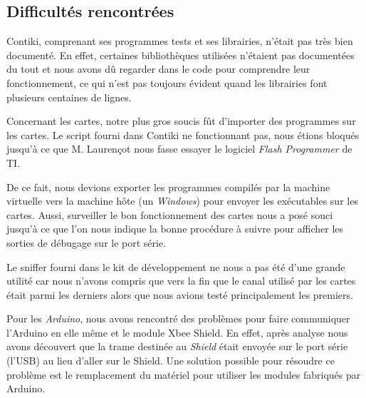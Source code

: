 
\subsection{Difficultés rencontrées}

Contiki, comprenant ses programmes tests et ses librairies, n'était pas très bien documenté.
En effet, certaines bibliothèques utilisées n'étaient pas documentées du tout et nous avons dû regarder dans le code pour comprendre leur fonctionnement, ce qui n'est pas toujours évident quand les librairies font plusieurs centaines de lignes.


Concernant les cartes, notre plus gros soucis fût d'importer des programmes sur les cartes.
Le script fourni dans Contiki ne fonctionnant pas, nous étions bloqués jusqu'à ce que M. Laurençot nous fasse essayer le logiciel \emph{Flash Programmer} de TI.

De ce fait, nous devions exporter les programmes compilés par la machine virtuelle vers la machine hôte (un \emph{Windows}) pour envoyer les exécutables sur les cartes.
Aussi, surveiller le bon fonctionnement des cartes nous a posé souci jusqu'à ce que l'on nous indique la bonne procédure à suivre pour afficher les sorties de débugage sur le port série.


Le sniffer fourni dans le kit de développement ne nous a pas été d'une grande utilité car nous n'avons compris que vers la fin que le canal utilisé par les cartes était parmi les derniers alors que nous avions testé principalement les premiers.  


Pour les \emph{Arduino}, nous avons rencontré des problèmes pour faire communiquer l'Arduino en elle même et le module Xbee Shield. 
En effet, après analyse nous avons découvert que la trame destinée au \emph{Shield} était envoyée sur le port série (l'USB) au lieu d'aller sur le Shield.
Une solution possible pour résoudre ce problème est le remplacement du matériel pour utiliser les modules fabriqués par Arduino.

